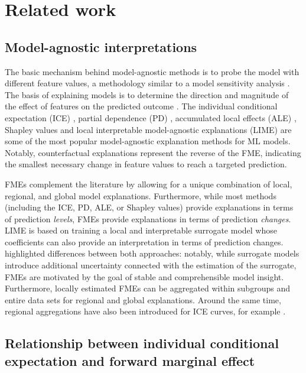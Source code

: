 \section{Related work}

\subsection{Model-agnostic interpretations}

The basic mechanism behind model-agnostic methods is to probe the model with different feature values, a methodology similar to a model sensitivity analysis \citep{scholbeck_framework, scholbeck_bridgingthegap}. The basis of explaining models is to determine the direction and magnitude of the effect of features on the predicted outcome \citep{casalicchio_featureimportance, scholbeck_framework, scholbeck_fme}. The individual conditional expectation (ICE) \citep{goldstein_ice}, partial dependence (PD) \citep{friedman_pdp}, accumulated local effects (ALE) \citep{apley_ale}, Shapley values \citep{strumbelj_shapley, lundberg_shap, covert_sage} and local interpretable model-agnostic explanations (LIME) \citep{ribeiro_lime} are some of the most popular model-agnostic explanation methods for ML models. Notably, counterfactual explanations \citep{wachter_counterfactuals} represent the reverse of the FME, indicating the smallest necessary change in feature values to reach a targeted prediction.
\par
FMEs complement the literature by allowing for a unique combination of local, regional, and global model explanations. Furthermore, while most methods (including the ICE, PD, ALE, or Shapley values) provide explanations in terms of prediction \textit{levels}, FMEs provide explanations in terms of prediction \textit{changes}. LIME is based on training a local and interpretable surrogate model whose coefficients can also provide an interpretation in terms of prediction changes. \citet{scholbeck_fme} highlighted differences between both approaches: notably, while surrogate models introduce additional uncertainty connected with the estimation of the surrogate, FMEs are motivated by the goal of stable and comprehensible model insight. Furthermore, locally estimated FMEs can be aggregated within subgroups and entire data sets for regional and global explanations. 
Around the same time, regional aggregations have also been introduced for ICE curves, for example \citep{britton_vine, herbinger_repid, molnar_cpfi}. 


\subsection{Relationship between individual conditional expectation and forward marginal effect}

